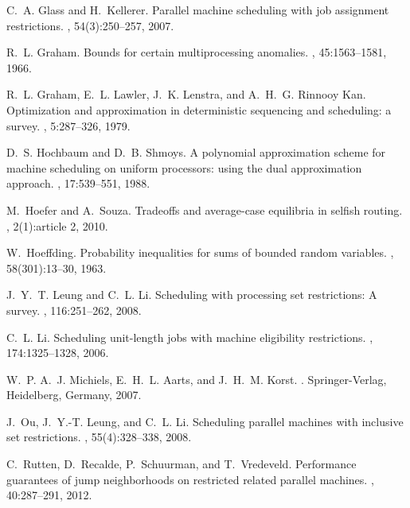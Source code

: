 \documentclass[a4paper,11pt,fleqn]{article}
\begin{document}
\begin{thebibliography}{10}
C.~A. Glass and H.~Kellerer.
\newblock Parallel machine scheduling with job assignment restrictions.
, 54(3):250--257, 2007.

R.~L. Graham.
\newblock Bounds for certain multiprocessing anomalies.
, 45:1563--1581, 1966.

R.~L. Graham, E.~L. Lawler, J.~K. Lenstra, and A.~H.~G. {Rinnooy Kan}.
\newblock Optimization and approximation in deterministic sequencing and
  scheduling: a survey.
, 5:287--326, 1979.

D.~S. Hochbaum and D.~B. Shmoys.
\newblock A polynomial approximation scheme for machine scheduling on uniform
  processors: using the dual approximation approach.
, 17:539--551, 1988.

M.~Hoefer and A.~Souza.
\newblock Tradeoffs and average-case equilibria in selfish routing.
, 2(1):article 2, 2010.

W.~Hoeffding.
\newblock Probability inequalities for sums of bounded random variables.
,
  58(301):13--30, 1963.

J.~Y.~T. Leung and C.~L. Li.
\newblock Scheduling with processing set restrictions: A survey.
, 116:251--262,
  2008.

C.~L. Li.
\newblock Scheduling unit-length jobs with machine eligibility restrictions.
, 174:1325--1328, 2006.

W.~P. A.~J. Michiels, E.~H.~L. Aarts, and J.~H.~M. Korst.
.
\newblock Springer-Verlag, Heidelberg, Germany, 2007.

J.~Ou, J.~Y.-T. Leung, and C.~L. Li.
\newblock Scheduling parallel machines with inclusive set restrictions.
, 55(4):328--338, 2008.

C.~Rutten, D.~Recalde, P.~Schuurman, and T.~Vredeveld.
\newblock Performance guarantees of jump neighborhoods on restricted related
  parallel machines.
, 40:287--291, 2012.


\end{thebibliography}
\end{document}

